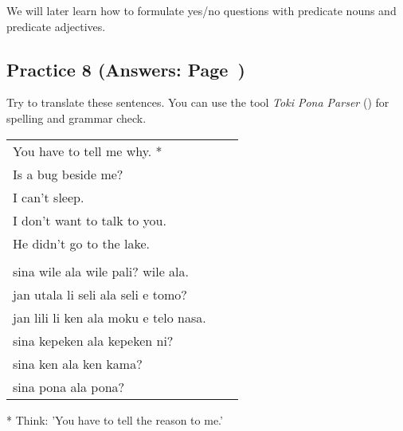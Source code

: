 We will later learn how to formulate yes/no questions with predicate nouns and predicate adjectives.
%
\newpage
\subsection*{Practice 8 (Answers: Page~\pageref{'negation_yes_no_questions'})}
%
Try to translate these sentences. 
You can use the tool \textit{Toki Pona Parser} (\cite{www:rowa:02}) for spelling and grammar check. 

\begin{supertabular}{p{5,5cm}|ll}
You have to tell me why. *  &&   \\ %
Is a bug beside me?  &&    \\ %
I can't sleep.  &&    \\ %
I don't want to talk to you.  &&    \\ %
He didn't go to the lake.   &&   \\ %
 && \\ %
sina wile ala wile pali? wile ala.  &&    \\ %
jan utala li seli ala seli e tomo?   &&   \\ %
jan lili li ken ala moku e telo nasa.   &&   \\ %
sina kepeken ala kepeken ni?  &&    \\ %
sina ken ala ken kama?   &&   \\ %
sina pona ala pona? &&   \\ %
\end{supertabular} 

* Think: 'You have to tell the reason to me.' 
